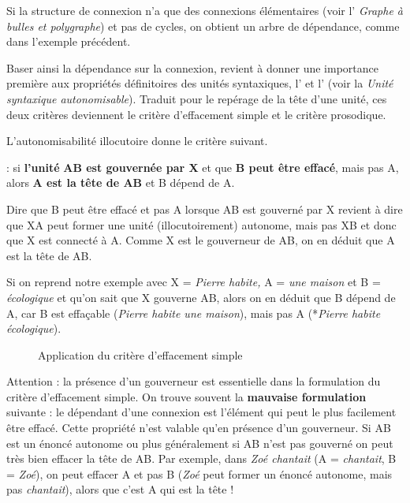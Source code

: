Si la structure de connexion n’a que des connexions élémentaires (voir l’ \textit{Graphe à bulles et polygraphe}) et pas de cycles, on obtient un arbre de dépendance, comme dans l’exemple précédent.

Baser ainsi la dépendance sur la connexion, revient à donner une importance première aux propriétés définitoires des unités syntaxiques, l’ et l’ (voir la  \textit{Unité syntaxique autonomisable}). Traduit pour le repérage de la tête d’une unité, ces deux critères deviennent le critère d’effacement simple et le critère prosodique.

L’autonomisabilité illocutoire donne le critère suivant.

{ : si \textbf{l’unité} \textbf{AB est gouvernée par X} et que \textbf{B peut être effacé}, mais pas A, alors \textbf{A est la tête de AB} et B dépend de A.}

Dire que B peut être effacé et pas A lorsque AB est gouverné par X revient à dire que XA peut former une unité (illocutoirement) autonome, mais pas XB et donc que X est connecté à A. Comme X est le gouverneur de AB, on en déduit que A est la tête de AB.

Si on reprend notre exemple avec X = \textit{Pierre habite,} A = \textit{une maison} et B = \textit{écologique} et qu’on sait que X gouverne AB, alors on en déduit que B dépend de A, car B est effaçable (\textit{Pierre habite une maison}), mais pas A (*\textit{Pierre habite écologique}).

\begin{figure}
\caption{\label{fig:}Application du critère d’effacement simple}
\end{figure}

Attention : la présence d’un gouverneur est essentielle dans la formulation du  critère d’effacement simple. On trouve souvent la \textbf{mauvaise formulation} suivante : le dépendant d’une connexion est l’élément qui peut le plus facilement être effacé. Cette propriété n’est valable qu’en présence d’un gouverneur. Si AB est un énoncé autonome ou plus généralement si AB n’est pas gouverné on peut très bien effacer la tête de AB. Par exemple, dans \textit{Zoé chantait} (A = \textit{chantait}, B = \textit{Zoé}), on peut effacer A et pas B (\textit{Zoé} peut former un énoncé autonome, mais pas \textit{chantait}), alors que c’est A qui est la tête !

